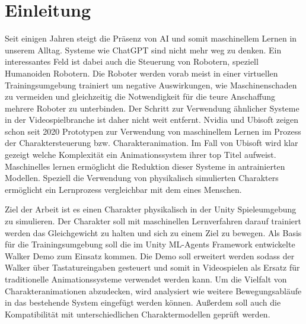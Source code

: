 \chapter{Einleitung}
\label{sec:einleitung}
Seit einigen Jahren steigt die Präsenz von AI und somit maschinellem Lernen in unserem Alltag. Systeme wie ChatGPT sind nicht mehr weg zu denken. Ein interessantes Feld ist dabei auch die Steuerung von Robotern, speziell Humanoiden Robotern. Die Roboter werden vorab meist in einer virtuellen Trainingsumgebung trainiert um negative Auswirkungen, wie Maschinenschaden zu vermeiden und gleichzeitig die Notwendigkeit für die teure Anschaffung mehrere Roboter zu unterbinden. Der Schritt zur Verwendung ähnlicher Systeme in der Videospielbranche ist daher nicht weit entfernt. Nvidia und Ubisoft zeigen schon seit 2020 Prototypen zur Verwendung von maschinellem Lernen im Prozess der Charaktersteuerung bzw. Charakteranimation.\cite{2022-TOG-ASE}\cite{10.1145/3355089.3356536} Im Fall von Ubisoft wird klar gezeigt welche Komplexität ein Animationssystem ihrer top Titel aufweist. Maschinelles lernen ermöglicht die Reduktion dieser Systeme in antrainierten Modellen. Speziell die Verwendung von physikalisch simulierten Charakters ermöglicht ein Lernprozess vergleichbar mit dem eines Menschen.

Ziel der Arbeit ist es einen Charakter physikalisch in der Unity Spieleumgebung zu simulieren. Der Charakter soll mit maschinellen Lernverfahren darauf trainiert werden das Gleichgewicht zu halten und sich zu einem Ziel zu bewegen. Als Basis für die Trainingsumgebung soll die im Unity ML-Agents Framework entwickelte Walker Demo zum Einsatz kommen. Die Demo soll erweitert werden sodass der Walker über Tastatureingaben gesteuert und somit in Videospielen als Ersatz für traditionelle Animationssysteme verwendet werden kann. Um die Vielfalt von Charakteranimationen abzudecken, wird analysiert wie weitere Bewegungsabläufe in das bestehende System eingefügt werden können. Außerdem soll auch die Kompatibilität mit unterschiedlichen Charaktermodellen geprüft werden.

